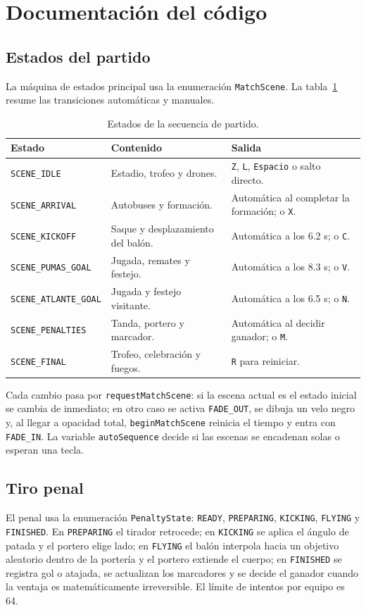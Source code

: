 \documentclass[12pt,letterpaper]{article}
\begin{document}
\section{Documentación del código}
\subsection{Estados del partido}
La máquina de estados principal usa la enumeración \texttt{MatchScene}. La tabla~\ref{tab:estados}
resume las transiciones automáticas y manuales.

\begin{table}[H]
\centering
\small
\begin{tabular}{p{}p{}p{}}
\toprule
\textbf{Estado} & \textbf{Contenido} & \textbf{Salida}\\
\midrule
\texttt{SCENE\_IDLE} & Estadio, trofeo y drones. & \texttt{Z}, \texttt{L}, \texttt{Espacio} o salto directo.\\
\texttt{SCENE\_ARRIVAL} & Autobuses y formación. & Automática al completar la formación; o \texttt{X}.\\
\texttt{SCENE\_KICKOFF} & Saque y desplazamiento del balón. & Automática a los 6.2 s; o \texttt{C}.\\
\texttt{SCENE\_PUMAS\_GOAL} & Jugada, remates y festejo. & Automática a los 8.3 s; o \texttt{V}.\\
\texttt{SCENE\_ATLANTE\_GOAL} & Jugada y festejo visitante. & Automática a los 6.5 s; o \texttt{N}.\\
\texttt{SCENE\_PENALTIES} & Tanda, portero y marcador. & Automática al decidir ganador; o \texttt{M}.\\
\texttt{SCENE\_FINAL} & Trofeo, celebración y fuegos. & \texttt{R} para reiniciar.\\
\bottomrule
\end{tabular}
\caption{Estados de la secuencia de partido.}\label{tab:estados}
\end{table}

Cada cambio pasa por \texttt{requestMatchScene}: si la escena actual es el estado inicial se cambia
de inmediato; en otro caso se activa \texttt{FADE\_OUT}, se dibuja un velo negro y, al llegar a
opacidad total, \texttt{beginMatchScene} reinicia el tiempo y entra con \texttt{FADE\_IN}. La variable
\texttt{autoSequence} decide si las escenas se encadenan solas o esperan una tecla.

\subsection{Tiro penal}
El penal usa la enumeración \texttt{PenaltyState}: \texttt{READY}, \texttt{PREPARING},
\texttt{KICKING}, \texttt{FLYING} y \texttt{FINISHED}. En \texttt{PREPARING} el tirador retrocede;
en \texttt{KICKING} se aplica el ángulo de patada y el portero elige lado; en \texttt{FLYING} el
balón interpola hacia un objetivo aleatorio dentro de la portería y el portero extiende el cuerpo;
en \texttt{FINISHED} se registra gol o atajada, se actualizan los marcadores y se decide el ganador
cuando la ventaja es matemáticamente irreversible. El límite de intentos por equipo es 64.
\end{document}
